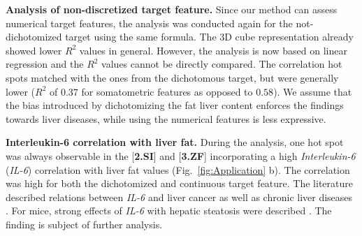 \documentclass[journal]{style/vgtc} 			          %
\begin{document}
%
%
%

\textbf{Analysis of non-discretized target feature.}
Since our method can assess numerical target features, the analysis was conducted again for the not-dichotomized target using the same formula.
The 3D cube representation already showed lower $R^2$ values in general. However, the analysis is now based on linear regression and the $R^2$ values cannot be directly compared.
The correlation hot spots matched with the ones from the dichotomous target, but were generally lower ($R^2$ of $0.37$ for somatometric features as opposed to $0.58$).
We assume that the bias introduced by dichotomizing the fat liver content enforces the findings towards liver diseases, while using the numerical features is less expressive.

\textbf{Interleukin-6 correlation with liver fat.}
During the analysis, one hot spot was always observable in the [\textbf{2.SI}] and [\textbf{3.ZF}] incorporating a high \emph{Interleukin-6} (\emph{IL-6}) correlation with liver fat values (Fig.~\ref{fig:Application} b).
The correlation was high for both the dichotomized and continuous target feature.
The literature described relations between \emph{IL-6} and liver cancer \cite{He2013} as well as chronic liver diseases \cite{Streetz2003}.
For mice, strong effects of \emph{IL-6} with hepatic steatosis were described \cite{Hong2004}.
The finding is subject of further analysis.
\end{document}
